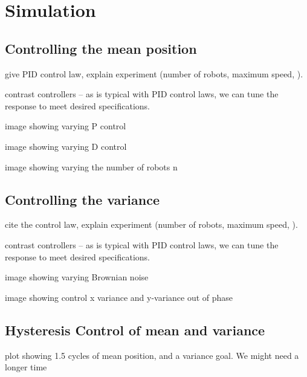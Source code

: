 \section{Simulation}\label{sec:simulation}

\subsection{Controlling the mean position}

give PID control law, explain experiment (number of robots, maximum speed, ).

contrast controllers -- as is typical with PID control laws, we can tune the response to meet desired specifications.


image showing varying P control  %

image showing varying D control

image showing varying the number of robots n %


\subsection{Controlling the variance}

cite the control law, explain experiment (number of robots, maximum speed, ).

contrast controllers -- as is typical with PID control laws, we can tune the response to meet desired specifications.

image showing varying Brownian noise

image showing control x variance and y-variance out of phase


\subsection{Hysteresis Control of mean and variance}

plot showing 1.5 cycles of mean position, and a variance goal.  We might need a longer time





